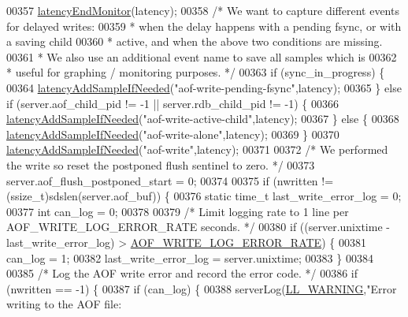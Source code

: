 \begin{DoxyCode}
{{{00357     \hyperlink{latency_8h_a88461aee20da0a648fe3332b5f068df7}{latencyEndMonitor}(latency);
00358     \textcolor{comment}{/* We want to capture different events for delayed writes:}
00359 \textcolor{comment}{     * when the delay happens with a pending fsync, or with a saving child}
00360 \textcolor{comment}{     * active, and when the above two conditions are missing.}
00361 \textcolor{comment}{     * We also use an additional event name to save all samples which is}
00362 \textcolor{comment}{     * useful for graphing / monitoring purposes. */}
00363     \textcolor{keywordflow}{if} (sync\_in\_progress) \{
00364         \hyperlink{latency_8h_a77922ab34035890c90f98831a9071359}{latencyAddSampleIfNeeded}(\textcolor{stringliteral}{"aof-write-pending-fsync"},latency);
00365     \} \textcolor{keywordflow}{else} \textcolor{keywordflow}{if} (server.aof\_child\_pid != -1 || server.rdb\_child\_pid != -1) \{
00366         \hyperlink{latency_8h_a77922ab34035890c90f98831a9071359}{latencyAddSampleIfNeeded}(\textcolor{stringliteral}{"aof-write-active-child"},latency);
00367     \} \textcolor{keywordflow}{else} \{
00368         \hyperlink{latency_8h_a77922ab34035890c90f98831a9071359}{latencyAddSampleIfNeeded}(\textcolor{stringliteral}{"aof-write-alone"},latency);
00369     \}
00370     \hyperlink{latency_8h_a77922ab34035890c90f98831a9071359}{latencyAddSampleIfNeeded}(\textcolor{stringliteral}{"aof-write"},latency);
00371 
00372     \textcolor{comment}{/* We performed the write so reset the postponed flush sentinel to zero. */}
00373     server.aof\_flush\_postponed\_start = 0;
00374 
00375     \textcolor{keywordflow}{if} (nwritten != (ssize\_t)sdslen(server.aof\_buf)) \{
00376         \textcolor{keyword}{static} time\_t last\_write\_error\_log = 0;
00377         \textcolor{keywordtype}{int} can\_log = 0;
00378 
00379         \textcolor{comment}{/* Limit logging rate to 1 line per AOF\_WRITE\_LOG\_ERROR\_RATE seconds. */}
00380         \textcolor{keywordflow}{if} ((server.unixtime - last\_write\_error\_log) > 
      \hyperlink{aof_8c_acffdc721a3cb2f3d8d8817c3ab88c9b0}{AOF\_WRITE\_LOG\_ERROR\_RATE}) \{
00381             can\_log = 1;
00382             last\_write\_error\_log = server.unixtime;
00383         \}
00384 
00385         \textcolor{comment}{/* Log the AOF write error and record the error code. */}
00386         \textcolor{keywordflow}{if} (nwritten == -1) \{
00387             \textcolor{keywordflow}{if} (can\_log) \{
00388                 serverLog(\hyperlink{server_8h_a31229b9334bba7d6be2a72970967a14b}{LL\_WARNING},\textcolor{stringliteral}{"Error writing to the AOF file: %
}}}}
\end{DoxyCode}
